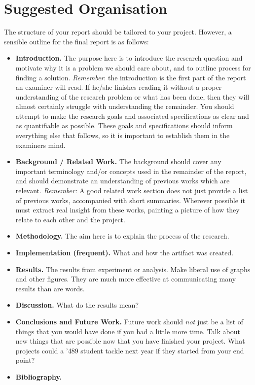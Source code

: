\section{Suggested Organisation}
The structure of your report should be tailored to your project. However, a
sensible outline for the final report is as follows:
\begin{itemize}
\item {\bf Introduction.}  The purpose here is to introduce the
  research question and motivate why it is a problem we should
  care about, and to outline process for finding a solution.  
  {\em Remember}: the introduction is the first part of the
  report an examiner will read. If he/she finishes reading it without
  a proper understanding of the research problem or what has been
  done, then they will almost certainly struggle with understanding
  the remainder. You should attempt to make the research goals and associated
  specifications as clear and as quantifiable as possible. These goals and
  specifications should inform everything else that follows, so it is important
  to establish them in the examiners mind.

\item {\bf Background / Related Work.}  The background should cover
  any important terminology and/or concepts used in the remainder of
  the report, and should demonstrate an understanding of previous
  works which are relevant.  {\em Remember:} A good related work
  section does not just provide a list of previous works, accompanied
  with short summaries.  Wherever possible it must extract real
  insight from these works, painting a picture of how they relate to
  each other and the project.

\item {\bf Methodology.} The aim here is to explain the process of the research. 

\item {\bf Implementation (frequent).} What and how the artifact was created. 

\item {\bf Results.}
  The results from experiment or analysis.
  Make liberal use of graphs and other figures. They are much more effective at
  communicating many results than are words.

\item {\bf Discussion.}
  What do the results mean?

\item {\bf Conclusions and Future Work.}
  Future work should \emph{not} just be a list of things that you would have
  done if you had a little more time. Talk about new things that are possible
  now that you have finished your project. What projects could a '489 student
  tackle next year if they started from your end point?

\item {\bf Bibliography.}
\end{itemize}


